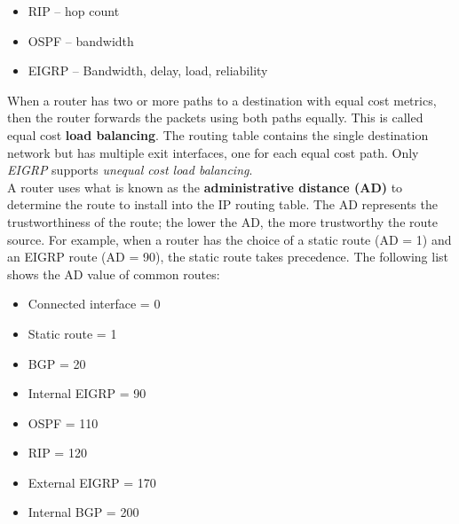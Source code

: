 \begin{itemize}
\item RIP -- hop count
\item OSPF -- bandwidth
\item EIGRP -- Bandwidth, delay, load, reliability
\end{itemize}

When a router has two or more paths to a destination with equal cost metrics, then the router forwards the packets using both paths equally. This is called equal cost \textbf{load balancing}. The routing table contains the single destination network but has multiple exit interfaces, one for each equal cost path. Only \emph{EIGRP} supports \emph{unequal cost load balancing}.\\

A router uses what is known as the \textbf{administrative distance (AD)} to determine the route to install into the IP routing table. The AD represents the trustworthiness of the route; the lower the AD, the more trustworthy the route source. For example, when a router has the choice of a static route (AD = 1) and an EIGRP route (AD = 90), the static route takes precedence. The following list shows the AD value of common routes:

\begin{itemize}
\item Connected interface = 0
\item Static route = 1
\item BGP = 20
\item Internal EIGRP = 90
\item OSPF = 110
\item RIP = 120
\item External EIGRP = 170
\item Internal BGP = 200
\end{itemize}